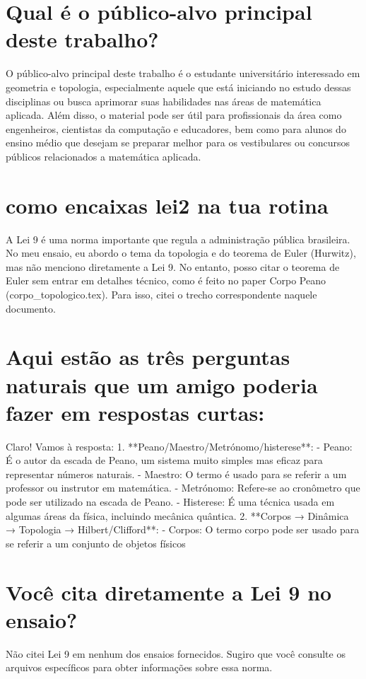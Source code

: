 \documentclass[11pt,a4paper]{article}
\begin{document}
\section{Qual é o público-alvo principal deste trabalho?}
O público-alvo principal deste trabalho é o estudante universitário interessado em geometria e topologia, especialmente aquele que está iniciando no estudo dessas disciplinas ou busca aprimorar suas habilidades nas áreas de matemática aplicada. Além disso, o material pode ser útil para profissionais da área como engenheiros, cientistas da computação e educadores, bem como para alunos do ensino médio que desejam se preparar melhor para os vestibulares ou concursos públicos relacionados a matemática aplicada.

\section{como encaixas lei2 na tua rotina}
A Lei 9 é uma norma importante que regula a administração pública brasileira. No meu ensaio, eu abordo o tema da topologia e do teorema de Euler (Hurwitz), mas não menciono diretamente a Lei 9. No entanto, posso citar o teorema de Euler sem entrar em detalhes técnico, como é feito no paper Corpo Peano (corpo\_topologico.tex). Para isso, citei o trecho correspondente naquele documento.

\section{Aqui estão as três perguntas naturais que um amigo poderia fazer em respostas curtas:}
Claro! Vamos à resposta: 1. **Peano/Maestro/Metrónomo/histerese**: - Peano: É o autor da escada de Peano, um sistema muito simples mas eficaz para representar números naturais. - Maestro: O termo é usado para se referir a um professor ou instrutor em matemática. - Metrónomo: Refere-se ao cronômetro que pode ser utilizado na escada de Peano. - Histerese: É uma técnica usada em algumas áreas da física, incluindo mecânica quântica. 2. **Corpos → Dinâmica → Topologia → Hilbert/Clifford**: - Corpos: O termo corpo pode ser usado para se referir a um conjunto de objetos físicos

\section{Você cita diretamente a Lei 9 no ensaio?}
Não citei Lei 9 em nenhum dos ensaios fornecidos. Sugiro que você consulte os arquivos específicos para obter informações sobre essa norma.
\end{document}
